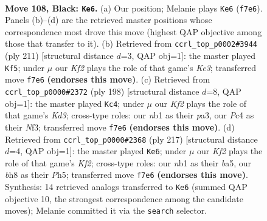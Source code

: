 \documentclass[11pt]{article}
\begin{document}
\clearpage

\begin{figure}[p]\centering
\begin{subfigure}{0.46\textwidth}\centering
\resizebox{\linewidth}{!}{%
\newchessgame
\chessboard[
  setfen={7B/5k2/8/8/p1p3b1/8/5K2/1N6 b - - 71 108},
  showmover=false,
  pgfstyle=straightmove, color=movearrow, markmove={f7-e6}
]}
\caption{}
\end{subfigure}\hfill
\begin{subfigure}{0.46\textwidth}\centering
\resizebox{\linewidth}{!}{%
\newchessgame
\chessboard[
  setfen={8/1b6/4k3/7p/5p1B/8/8/6K1 b - - 59 106},
  showmover=false,
  pgfstyle=straightmove, color=movearrow, markmove={e6-f5}
]}
\caption{}
\end{subfigure}
\\[4pt]
\begin{subfigure}{0.46\textwidth}\centering
\resizebox{\linewidth}{!}{%
\newchessgame
\chessboard[
  setfen={7b/8/8/k7/8/p2K1N2/P7/8 w - - 56 100},
  showmover=false,
  pgfstyle=straightmove, color=movearrow, markmove={d3-c4}
]}
\caption{}
\end{subfigure}\hfill
\begin{subfigure}{0.46\textwidth}\centering
\resizebox{\linewidth}{!}{%
\newchessgame
\chessboard[
  setfen={8/3b1k2/p7/B6p/7P/K7/8/8 b - - 47 109},
  showmover=false,
  pgfstyle=straightmove, color=movearrow, markmove={f7-e6}
]}
\caption{}
\end{subfigure}
\caption{\textbf{Move 108, Black: \texttt{Ke6}.} (a) Our position; Melanie plays \texttt{Ke6} (\texttt{f7e6}). Panels (b)--(d) are the retrieved master positions whose correspondence most drove this move (highest QAP objective among those that transfer to it). (b) Retrieved from \texttt{ccrl\_top\_p0002\#3944} (ply 211) [structural distance $d$=3, QAP obj=1]: the master played \texttt{Kf5}; under $\mu$ our \emph{Kf2} plays the role of that game's \emph{Ke3}; transferred move \texttt{f7e6} \textbf{(endorses this move)}. (c) Retrieved from \texttt{ccrl\_top\_p0000\#2372} (ply 198) [structural distance $d$=8, QAP obj=1]: the master played \texttt{Kc4}; under $\mu$ our \emph{Kf2} plays the role of that game's \emph{Kd3}; cross-type roles: our \emph{n}b1 as their \emph{p}a3, our \emph{P}c4 as their \emph{N}f3; transferred move \texttt{f7e6} \textbf{(endorses this move)}. (d) Retrieved from \texttt{ccrl\_top\_p0000\#2368} (ply 217) [structural distance $d$=4, QAP obj=1]: the master played \texttt{Ke6}; under $\mu$ our \emph{Kf2} plays the role of that game's \emph{Kf2}; cross-type roles: our \emph{n}b1 as their \emph{b}a5, our \emph{b}h8 as their \emph{P}h5; transferred move \texttt{f7e6} \textbf{(endorses this move)}. Synthesis: 14 retrieved analogs transferred to \texttt{Ke6} (summed QAP objective 10, the strongest correspondence among the candidate moves); Melanie committed it via the \texttt{search} selector.}
\label{fig:thought-m215}
\end{figure}
\end{document}

